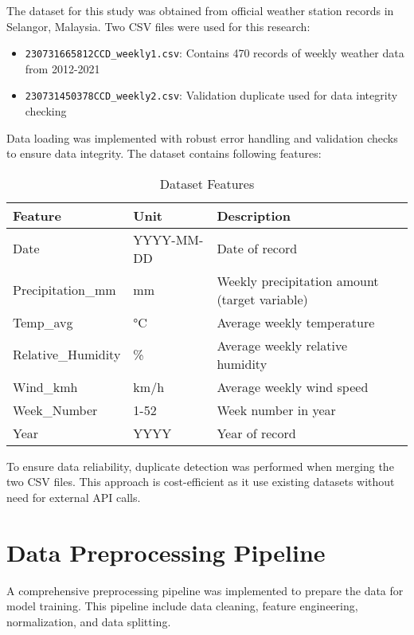 \documentclass[12pt]{article}
\begin{document}
The dataset for this study was obtained from official weather station records in Selangor, Malaysia. Two CSV files were used for this research:

\begin{itemize}
    \item \texttt{230731665812CCD\_weekly1.csv}: Contains 470 records of weekly weather data from 2012-2021
    \item \texttt{230731450378CCD\_weekly2.csv}: Validation duplicate used for data integrity checking
\end{itemize}

Data loading was implemented with robust error handling and validation checks to ensure data integrity. The dataset contains following features:

\begin{table}[h]
\centering
\caption{Dataset Features}
\label{tab:dataset_features}
\begin{tabular}{|l|l|p{8cm}|}
\hline
\textbf{Feature} & \textbf{Unit} & \textbf{Description} \\
\hline
Date & YYYY-MM-DD & Date of record \\
\hline
Precipitation\_mm & mm & Weekly precipitation amount (target variable) \\
\hline
Temp\_avg & °C & Average weekly temperature \\
\hline
Relative\_Humidity & \% & Average weekly relative humidity \\
\hline
Wind\_kmh & km/h & Average weekly wind speed \\
\hline
Week\_Number & 1-52 & Week number in year \\
\hline
Year & YYYY & Year of record \\
\hline
\end{tabular}
\end{table}

To ensure data reliability, duplicate detection was performed when merging the two CSV files. This approach is cost-efficient as it use existing datasets without need for external API calls.

\section{Data Preprocessing Pipeline}
\label{sec:data_preprocessing}

A comprehensive preprocessing pipeline was implemented to prepare the data for model training. This pipeline include data cleaning, feature engineering, normalization, and data splitting.
\end{document}

